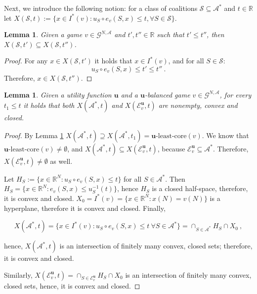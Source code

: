 \documentclass[a4paper,12pt]{article}
\newtheorem{lemma}[theorem]{Lemma}
\theoremstyle{definition}
\theoremstyle{remark}
\begin{document}
Next, we introduce the following notion: for a class of coalitions $\mathcal{S}\subseteq \mathcal{A}^*$ and $t\in \mathbb{R}$ let $X(\mathcal{S}, t):= \{ x\in I^\ast(v) \colon u_S\circ e_v(S, x) \leq t, \forall S\in \mathcal{S} \} $.

\begin{lemma}\label{lemma:X(t')<=X(t")}
Given a game $v\in \mathcal{G}^{N, \mathcal{A}}$ and $t', t'' \in \mathbb{R}$ such that $t'\leq t''$, then $X(\mathcal{S}, t') \subseteq X(\mathcal{S}, t'')$.
\end{lemma}

\begin{proof}
For any $x\in X(\mathcal{S}, t')$ it holds that $x\in I^*(v)$, and for all $S\in \mathcal{S}$:
\begin{equation*}
u_S\circ e_v(S, x) \leq t' \leq t'' \ .
\end{equation*}
Therefore, $x\in X(\mathcal{S}, t'')$.
\end{proof}

\begin{lemma}\label{lemma:convex}
Given a utility function $\mathbf{u}$ and a $\mathbf{u}$-balanced game $v\in \mathcal{G}^{N, \mathcal{A}}$, for every $t_1\leq t$ it holds that both $X(\mathcal{A}^\ast, t)$ and $X(\mathcal{E}_v^{\mathbf{u}}, t)$ are nonempty, convex and closed.
\end{lemma}

\begin{proof}
By Lemma \ref{lemma:X(t')<=X(t")} $X(\mathcal{A}^\ast, t) \supseteq X(\mathcal{A}^\ast, t_1) = \mathbf{u}\text{-least-core}(v)$. We know that $\mathbf{u}\text{-least-core}(v) \neq \emptyset$, and $X(\mathcal{A}^\ast, t) \subseteq X(\mathcal{E}_v^{\mathbf{u}}, t)$, because $\mathcal{E}_v^{\mathbf{u}} \subseteq \mathcal{A}^*$. Therefore, $X(\mathcal{E}_v^\mathbf{u}, t) \neq \emptyset$ as well.

Let $H_S := \{ x\in \mathbb{R}^N \colon u_S \circ e_v (S,x) \leq t \}$ for all $S\in\mathcal{A}^\ast$. Then $H_S = \{ x \in \mathbb{R}^N \colon e_v (S,x) \leq u_S^{-1}(t) \}$, hence $H_S$ is a closed half-space, therefore, it is convex and closed. $X_0 = I^*(v) = \{x\in \mathbb{R}^N \colon x(N) = v(N) \}$ is a hyperplane, therefore it is convex and closed. Finally,

\begin{equation*}
X(\mathcal{A}^*, t) = \{x\in I^*(v) \colon u_S \circ e_v (S,x) \leq t \ \forall S\in \mathcal{A}^* \} = \cap_{S\in \mathcal{A}^*}H_S\cap X_0 \ ,
\end{equation*}

\noindent hence, $X(\mathcal{A}^*, t)$ is an intersection of finitely many convex, closed sets; therefore, it is convex and closed.

Similarly, $X(\mathcal{E}_v^{\mathbf{u}}, t) = \cap_{S\in \mathcal{E}^{\mathbf{u}}_v}H_S\cap X_0$ is an intersection of finitely many convex, closed sets, hence, it is convex and closed.
\end{proof}
\end{document}

